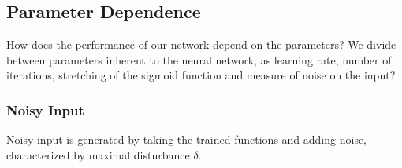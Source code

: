 \documentclass[useAMS,usenatbib]{templates/mn2e}
\begin{document}
\subsection{Parameter Dependence}
How does the performance of our network depend on the parameters? We
divide between parameters inherent to the neural network, as learning
rate, number of iterations, stretching of the sigmoid function and
measure of noise on the input?

\subsubsection{Noisy Input}
Noisy input is generated by taking the trained functions and adding noise, characterized by maximal disturbance $\delta$.
\end{document}
